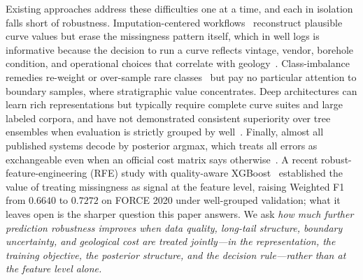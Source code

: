 \documentclass[bdcc,article,submit,pdftex,moreauthors]{Definitions/mdpi}
\begin{document}
Existing approaches address these difficulties one at a time, and each in isolation falls
short of robustness. Imputation-centered workflows~\cite{vanbuuren2011mice,stekhoven2012missforest,liu2025wellgan,xie2024cgan}
reconstruct plausible curve values but erase the missingness pattern itself, which in well
logs is informative because the decision to run a curve reflects vintage, vendor, borehole
condition, and operational choices that correlate with geology~\cite{chen2026rfe,little2019stats,josse2024missing}.
Class-imbalance remedies re-weight or over-sample rare
classes~\cite{chawla2002smote,lin2017focal,cui2019classbalanced,he2024imbalanced} but pay no
particular attention to boundary samples, where stratigraphic value concentrates. Deep
architectures can learn rich representations but typically require complete curve suites and
large labeled corpora, and have not demonstrated consistent superiority over tree ensembles
when evaluation is strictly grouped by
well~\cite{wang2024dnnlitho,grinsztajn2022trees,shwartzziv2022tabular,mcelfresh2024benchmark}.
Finally, almost all published systems decode by posterior argmax, which treats all errors as
exchangeable even when an official cost matrix says
otherwise~\cite{elkan2001cost,berger1985decision}. A recent robust-feature-engineering (RFE)
study with quality-aware XGBoost~\cite{chen2026rfe} established the value of treating
missingness as signal at the feature level, raising Weighted F1 from $0.6640$ to $0.7272$ on
FORCE 2020 under well-grouped validation; what it leaves open is the sharper question this
paper answers. We ask \emph{how much further prediction robustness improves when data quality,
long-tail structure, boundary uncertainty, and geological cost are treated jointly---in the
representation, the training objective, the posterior structure, and the decision rule---rather
than at the feature level alone.}
\end{document}
